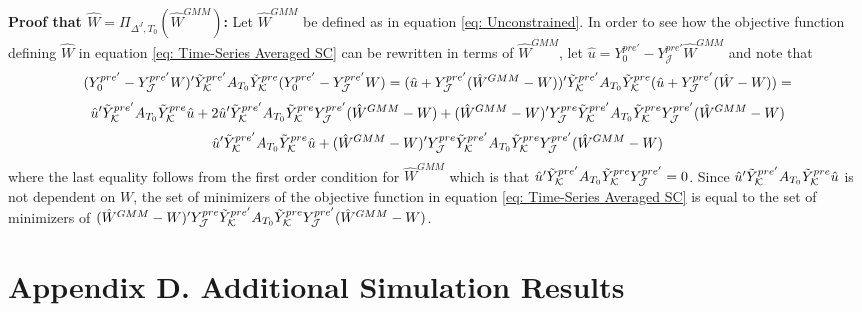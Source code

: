 \documentclass{article}
\begin{document}
\textbf{Proof that $\hat{W} = \Pi_{\Delta^J,T_0}(\hat{W}^{GMM})$:} Let $\hat{W}^{GMM}$ be defined as in equation \eqref{eq: Unconstrained}. In order to see how the objective function defining $\hat{W}$ in equation \eqref{eq: Time-Series Averaged SC} can be rewritten in terms of $\hat{W}^{GMM}$, let $\hat{u} = Y_{0}^{pre'} - Y_{\mathcal{J}}^{pre'} \hat{W}^{GMM}$ and note that 
\begin{equation*}
    (Y_{0}^{pre'} - Y_{\mathcal{J}}^{pre'} W)'\Tilde{Y}_{\mathcal{K}}^{pre'} A_{T_0} \Tilde{Y}_{\mathcal{K}}^{pre} (Y_{0}^{pre'} - Y_{\mathcal{J}}^{pre'} W) = (\hat{u} + Y_{\mathcal{J}}^{pre'}(\hat{W}^{GMM} - W))' \Tilde{Y}_{\mathcal{K}}^{pre'} A_{T_0} \Tilde{Y}_{\mathcal{K}}^{pre} (\hat{u} + Y_{\mathcal{J}}^{pre'} (\hat{W} - W)) = 
\end{equation*}
\begin{equation*}
    \hat{u}' \Tilde{Y}_{\mathcal{K}}^{pre'} A_{T_0} \Tilde{Y}_{\mathcal{K}}^{pre} \hat{u} + 2\hat{u}' \Tilde{Y}_{\mathcal{K}}^{pre'} A_{T_0} \Tilde{Y}_{\mathcal{K}}^{pre} Y_{\mathcal{J}}^{pre'} (\hat{W}^{GMM} - W) + (\hat{W}^{GMM} - W)' Y_{\mathcal{J}}^{pre} \Tilde{Y}_{\mathcal{K}}^{pre'} A_{T_0} \Tilde{Y}_{\mathcal{K}}^{pre} Y_{\mathcal{J}}^{pre'} (\hat{W}^{GMM} - W)
\end{equation*}
\begin{equation*}
    \hat{u}' \Tilde{Y}_{\mathcal{K}}^{pre'} A_{T_0} \Tilde{Y}_{\mathcal{K}}^{pre} \hat{u} + (\hat{W}^{GMM} - W)' Y_{\mathcal{J}}^{pre} \Tilde{Y}_{\mathcal{K}}^{pre'} A_{T_0} \Tilde{Y}_{\mathcal{K}}^{pre} Y_{\mathcal{J}}^{pre'} (\hat{W}^{GMM} - W)
\end{equation*}
where the last equality follows from the first order condition for $\hat{W}^{GMM}$ which is that $\hat{u}' \Tilde{Y}_{\mathcal{K}}^{pre'} A_{T_0} \Tilde{Y}_{\mathcal{K}}^{pre} Y_{\mathcal{J}}^{pre'} = 0$. Since $\hat{u}' \Tilde{Y}_{\mathcal{K}}^{pre'} A_{T_0} \Tilde{Y}_{\mathcal{K}}^{pre} \hat{u}$ is not dependent on $W$, the set of minimizers of the objective function in equation \eqref{eq: Time-Series Averaged SC} is equal to the set of minimizers of $(\hat{W}^{GMM} - W)' Y_{\mathcal{J}}^{pre} \Tilde{Y}_{\mathcal{K}}^{pre'} A_{T_0} \Tilde{Y}_{\mathcal{K}}^{pre} Y_{\mathcal{J}}^{pre'} (\hat{W}^{GMM} - W)$.

\section*{Appendix D. Additional Simulation Results}\label{ApD}
\end{document}
